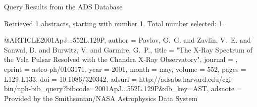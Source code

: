 Query Results from the ADS Database


Retrieved 1 abstracts, starting with number 1.  Total number selected: 1.

@ARTICLE{2001ApJ...552L.129P,
   author = {{Pavlov}, G.~G. and {Zavlin}, V.~E. and {Sanwal}, D. and {Burwitz}, V. and 
	{Garmire}, G.~P.},
    title = "{The X-Ray Spectrum of the Vela Pulsar Resolved with the Chandra X-Ray Observatory}",
  journal = {\apjl},
   eprint = {astro-ph/0103171},
     year = 2001,
    month = may,
   volume = 552,
    pages = {L129-L133},
      doi = {10.1086/320342},
   adsurl = {http://adsabs.harvard.edu/cgi-bin/nph-bib_query?bibcode=2001ApJ...552L.129P&db_key=AST},
  adsnote = {Provided by the Smithsonian/NASA Astrophysics Data System}
}


